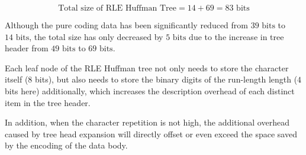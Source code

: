 \begin{parts}
\begin{solution}
    $$
    \text{Total size of RLE Huffman Tree} = 14 + 69 = 83 \text{ bits}
    $$

    Although the pure coding data has been significantly reduced from $39 \text{ bits}$ to $14 \text{ bits}$, the total size has only decreased by $5 \text{ bits}$ due to the increase in tree header from $49 \text{ bits}$ to $69 \text{ bits}$.

    Each leaf node of the RLE Huffman tree not only needs to store the character itself ($8$ bits), but also needs to store the binary digits of the run-length length ($4$ bits here) additionally, which increases the description overhead of each distinct item in the tree header.

    In addition, when the character repetition is not high, the additional overhead caused by tree head expansion will directly offset or even exceed the space saved by the encoding of the data body.
    \end{solution}

\end{parts}
